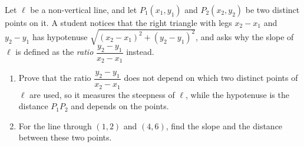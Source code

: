 Let $\ell$ be a non-vertical line, and let $P_1(x_1,y_1)$ and $P_2(x_2,y_2)$ be two distinct points on it. A student notices that the right triangle with legs $x_2-x_1$ and $y_2-y_1$ has hypotenuse $\sqrt{(x_2-x_1)^2+(y_2-y_1)^2}$, and asks why the slope of $\ell$ is defined as the \emph{ratio} $\dfrac{y_2-y_1}{x_2-x_1}$ instead.
\begin{enumerate}
\item[(a)] Prove that the ratio $\dfrac{y_2-y_1}{x_2-x_1}$ does not depend on which two distinct points of $\ell$ are used, so it measures the steepness of $\ell$, while the hypotenuse is the distance $P_1P_2$ and depends on the points.
\item[(b)] For the line through $(1,2)$ and $(4,6)$, find the slope and the distance between these two points.
\end{enumerate}
